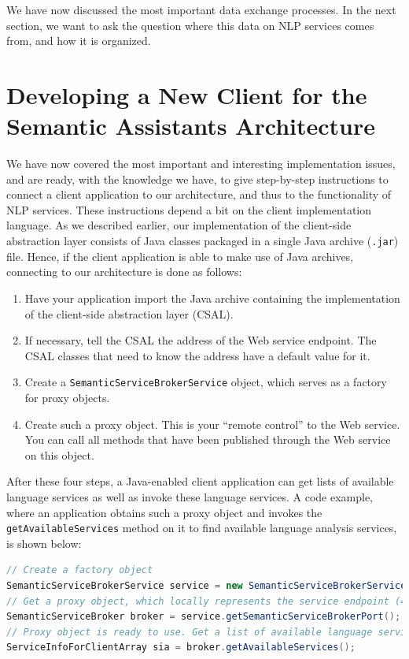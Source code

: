 We have now discussed the most important data exchange processes. In
the next section, we want to ask the question where this data on NLP
services comes from, and how it is organized.

\section{Developing a New Client for the Semantic Assistants Architecture}
We have now covered the most important and interesting implementation
issues, and are ready, with the knowledge we have, to give
step-by-step instructions to connect a client application to our
architecture, and thus to the functionality of NLP services. These
instructions depend a bit on the client implementation language. As we
described earlier, our implementation of the client-side abstraction
layer consists of Java classes packaged in a single Java archive
(\texttt{.jar}) file. Hence, if the client application is able to make
use of Java archives, connecting to our architecture is done as
follows:

\begin{enumerate}
\item Have your application import the Java archive containing the
    implementation of the client-side abstraction layer (CSAL).

\item If necessary, tell the CSAL the address of the Web service
    endpoint. The CSAL classes that need to know the address have a
    default value for it.

\item Create a \texttt{SemanticServiceBrokerService} object, which
    serves as a factory for proxy objects.

\item Create such a proxy object. This is your ``remote control'' to
    the Web service. You can call all methods that have been published
    through the Web service on this object.
\end{enumerate}

After these four steps, a Java-enabled client application can get
lists of available language services as well as invoke these language
services. A code example, where an application obtains such a proxy
object and invokes the \texttt{getAvailableServices} method on it to
find available language analysis services, is shown below:

\begin{lstlisting}[language=Java,xleftmargin=4mm,columns=flexible]
// Create a factory object
SemanticServiceBrokerService service = new SemanticServiceBrokerService();
// Get a proxy object, which locally represents the service endpoint (= port)
SemanticServiceBroker broker = service.getSemanticServiceBrokerPort();
// Proxy object is ready to use. Get a list of available language services.
ServiceInfoForClientArray sia = broker.getAvailableServices();
\end{lstlisting}

